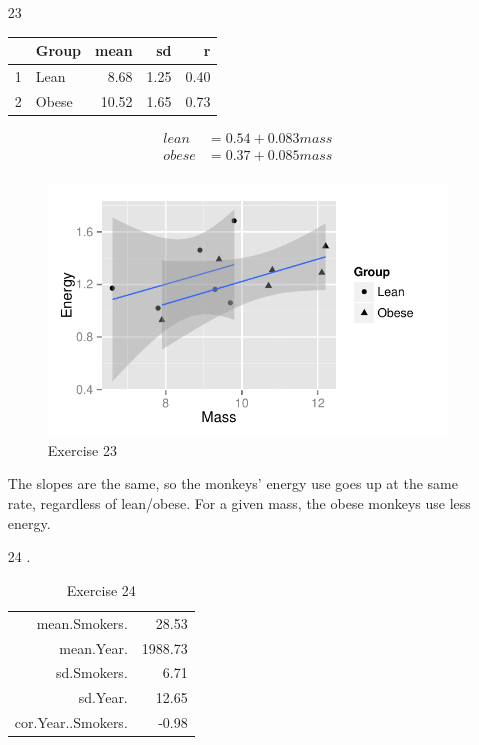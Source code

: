 \documentclass[landscape]{exam}
\begin{document}
\begin{enumerate}
    \item[23]
      \begin{table}[H]
        \centering
        \begin{tabular}{rlrrr}
          \toprule
                   & Group & mean  & sd   & r \\
          \midrule
          1        & Lean  & 8.68  & 1.25 & 0.40 \\
          2        & Obese & 10.52 & 1.65 & 0.73 \\
          \bottomrule
        \end{tabular}
      \end{table}

      \begin{align*}
        lean  & = 0.54 + 0.083 mass \\
        obese & = 0.37 + 0.085 mass \\
      \end{align*}

      \begin{figure}[H]
        \centering
        \includegraphics[scale = 0.8]{figures/ex23.pdf}
        \caption{Exercise 23}
      \end{figure}

      The slopes are the same, so the monkeys' energy use goes up at the same
      rate, regardless of lean/obese.  For a given mass, the obese monkeys use
      less energy.

    \item[24].
      \begin{table}[H]
        \centering
        \begin{tabular}{rr}
          \toprule
          mean.Smokers.      & 28.53 \\
          mean.Year.         & 1988.73 \\
          sd.Smokers.        & 6.71 \\
          sd.Year.           & 12.65 \\
          cor.Year..Smokers. & -0.98 \\
          \bottomrule
        \end{tabular}
        \caption{Exercise 24}
      \end{table}


\end{enumerate}
\end{document}
